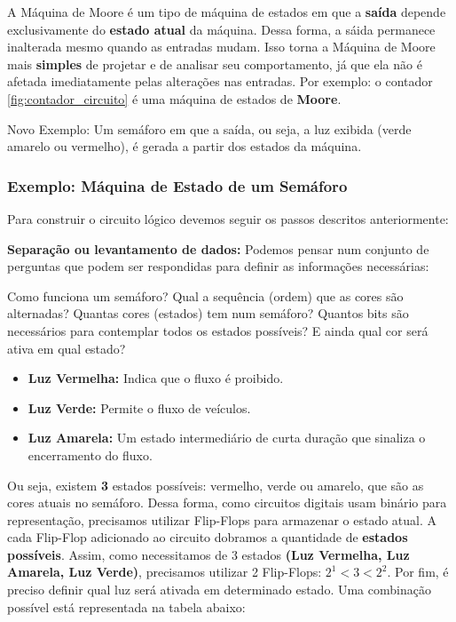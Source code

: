 \documentclass[12pt]{article}
\begin{document}
A Máquina de Moore é um tipo de máquina de estados em que a \textbf{saída} depende exclusivamente do \textbf{estado atual} da máquina. Dessa forma, a sáida permanece inalterada mesmo quando as entradas mudam. Isso torna a Máquina de Moore mais \textbf{simples} de projetar e de analisar seu comportamento, já que ela não é afetada imediatamente pelas alterações nas entradas. Por exemplo: o contador \ref{fig:contador_circuito} é uma máquina de estados de \textbf{Moore}.

Novo Exemplo: Um semáforo em que a saída, ou seja, a luz exibida (verde amarelo ou vermelho), é gerada a partir dos estados da máquina. 

\subsubsection{Exemplo: Máquina de Estado de um Semáforo}
Para construir o circuito lógico devemos seguir os passos descritos anteriormente:


\textbf{Separação ou levantamento de dados:}
Podemos pensar num conjunto de perguntas que podem ser respondidas para definir as informações necessárias:

Como funciona um semáforo? Qual a sequência (ordem) que as cores são alternadas? Quantas cores (estados) tem num semáforo? Quantos bits são necessários para contemplar todos os estados possíveis? E ainda qual cor será ativa em qual estado?

\begin{itemize}
    \item \textbf{Luz Vermelha:} Indica que o fluxo é proibido.
    \item \textbf{Luz Verde:} Permite o fluxo de veículos. 
    \item \textbf{Luz Amarela:} Um estado intermediário de curta duração que sinaliza o encerramento do fluxo. 
\end{itemize}
Ou seja, existem \textbf{3} estados possíveis: vermelho, verde ou amarelo, que são as cores atuais no semáforo. Dessa forma, como circuitos digitais usam binário para representação, precisamos utilizar Flip-Flops para armazenar o estado atual. A cada Flip-Flop adicionado ao circuito dobramos a quantidade de \textbf{estados possíveis}. Assim, como necessitamos de 3 estados \textbf{(Luz Vermelha, Luz Amarela, Luz Verde)}, precisamos utilizar 2 Flip-Flops:
$2^1 < 3 < 2^2$. Por fim, é preciso definir qual luz será ativada em determinado estado. Uma combinação possível está representada na tabela abaixo:
\end{document}
